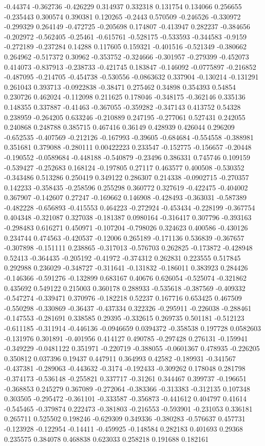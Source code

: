 -0.44374 -0.362736 -0.426229 0.314937 0.332318 0.131754 0.134066 0.256655 -0.235443 0.300574 0.390381 0.120265 -0.2443 0.570509 -0.246526 -0.330972 -0.299329 0.264149 -0.472725 -0.205698 0.174807 -0.413947 0.282237 -0.384656 -0.202972 -0.562405 -0.25461 -0.615761 -0.528175 -0.533593 -0.344583 -0.9159 -0.272189 -0.237284 0.14288 0.117605 0.159321 -0.401516 -0.521349 -0.380662 0.264962 -0.517372 0.30962 -0.353752 -0.324666 -0.301957 -0.279399 -0.452073 0.414073 -0.837913 -0.238733 -0.421745 0.183847 -0.146092 -0.0775897 -0.216852 -0.487095 -0.214705 -0.454738 -0.530556 -0.0863632 0.337904 -0.130214 -0.131291 0.261043 0.393713 -0.0922838 -0.38471 0.275462 0.34898 0.354393 0.54854 0.230726 0.462024 -0.112098 0.211625 0.178046 -0.348175 -0.362146 0.335136 0.148355 0.337887 -0.41463 -0.367055 -0.359282 -0.347143 0.413752 0.54328 0.238959 -0.264205 0.633246 -0.210889 0.247195 -0.277061 0.527431 0.242055 0.240868 0.248788 0.385715 0.467416 0.36149 0.428939 0.426044 0.296209 -0.652535 -0.407569 -0.212126 -0.167993 -0.39605 -0.684684 -0.554558 -0.388981 0.351681 0.379088 -0.280111 0.00422223 0.233547 -0.152775 -0.156657 -0.20448 -0.190552 -0.0589684 -0.448188 -0.540879 -0.23496 0.386331 0.745746 0.109159 -0.539427 -0.252683 0.168124 -0.197805 0.27117 0.463577 0.400508 -0.530352 -0.343486 0.513286 0.250419 0.349122 0.286307 0.214338 -0.0902715 -0.270357 0.142233 -0.358435 -0.258596 0.255298 0.360772 0.327619 -0.422475 -0.404002 0.367907 -0.142607 0.27247 -0.169662 0.146908 -0.428493 -0.363031 -0.587389 -0.482228 -0.656893 -0.415553 0.464223 -0.272924 -0.453434 -0.228199 -0.367754 0.404348 -0.321087 0.327038 -0.181387 0.0980164 -0.316417 0.307796 -0.393163 -0.298483 0.616271 0.450971 -0.107204 -0.798026 0.324623 0.400586 -0.430126 0.234744 0.474563 -0.420537 -0.12006 0.265189 -0.171136 0.536839 -0.367657 -0.307898 -0.151111 0.238865 -0.317013 -0.576703 0.262825 -0.173872 -0.428948 0.52413 -0.364435 -0.205192 -0.41972 -0.374312 0.262831 0.223555 0.517845 0.292988 0.236029 -0.348727 -0.311641 -0.131832 -0.186011 0.383923 0.284426 -0.146366 -0.591276 -0.132899 0.683167 0.40676 0.626054 -0.525074 -0.321862 0.435692 0.549122 0.215003 0.360178 0.288933 -0.535618 -0.387569 -0.409332 -0.547274 -0.339471 0.370976 -0.182218 0.52237 0.167716 0.653425 0.467509 -0.550298 -0.330869 -0.36437 -0.437334 0.322326 -0.295911 -0.226038 -0.288461 -0.147553 -0.281691 0.338585 0.29395 -0.332615 0.269735 0.501181 -0.512123 -0.611185 -0.311914 -0.446136 -0.0946659 0.0394372 -0.358538 0.197728 0.0582603 -0.131976 0.301891 -0.401956 0.414127 0.490785 -0.297428 0.276131 -0.159941 -0.349229 -0.0481122 0.351971 -0.220719 -0.388055 -0.0601367 0.478935 -0.226205 0.350812 0.037396 0.19437 0.447911 0.364993 0.42582 -0.189931 -0.341567 -0.437381 -0.289063 -0.443632 -0.3174 -0.192433 -0.309262 0.178048 0.281798 -0.374173 -0.536148 -0.255821 0.337717 -0.31261 0.344467 0.399737 -0.196651 -0.368853 0.245279 0.367089 -0.272064 -0.383366 -0.313383 -0.312135 0.107348 0.303505 -0.295472 -0.361101 -0.333587 -0.356873 -0.441612 0.404797 0.41614 -0.545465 -0.379874 0.222473 -0.381803 -0.216553 -0.593901 -0.231053 0.336181 0.265711 0.525502 0.198246 -0.629309 0.349336 -0.380283 -0.576637 0.457731 -0.123928 -0.122954 -0.14411 -0.459925 -0.148584 0.282183 0.401693 0.29368 0.235575 0.384078 0.468838 0.623033 0.258218 0.191688 0.182161 